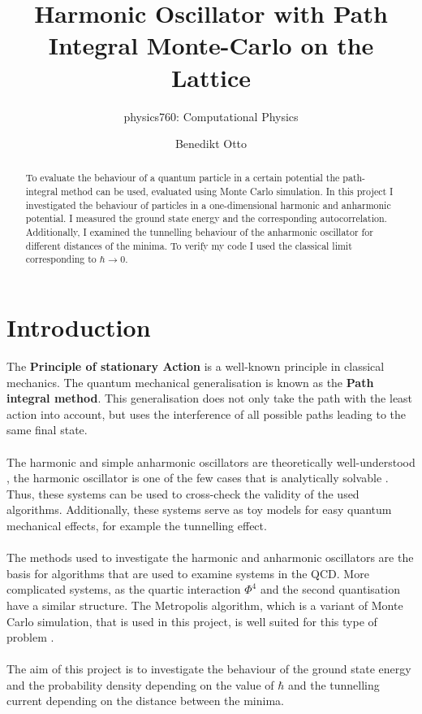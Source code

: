 \documentclass{scrartcl}
\title{Harmonic Oscillator with Path Integral Monte-Carlo on the Lattice}
\author{Benedikt Otto}
\subtitle{physics760: Computational Physics}
\begin{document}
	\maketitle

	\newpage

	\tableofcontents

	\newpage

	\begin{abstract}
		To evaluate the behaviour of a quantum particle in a certain potential the path-integral method can be used, evaluated using Monte Carlo simulation.
		In this project I investigated the behaviour of particles in a one-dimensional harmonic and anharmonic potential.
		I measured the ground state energy and the corresponding autocorrelation.
		Additionally, I examined the tunnelling behaviour of the anharmonic oscillator for different distances of the minima.
		To verify my code I used the classical limit corresponding to $\hbar \rightarrow 0$.
	\end{abstract}

	\section{Introduction}
		The \textbf{Principle of stationary Action} is a well-known principle in classical mechanics.
		The quantum mechanical generalisation is known as the \textbf{Path integral method}.
		This generalisation does not only take the path with the least action into account, but uses the interference of all possible paths leading to the same final state.
		\\\\
		The harmonic and simple anharmonic oscillators are theoretically well-understood \cite{bender}, the harmonic oscillator is one of the few cases that is analytically solvable \cite{rushka_freericks}.
		Thus, these systems can be used to cross-check the validity of the used algorithms.
		Additionally, these systems serve as toy models for easy quantum mechanical effects, for example the tunnelling effect.
		\\\\
		The methods used to investigate the harmonic and anharmonic oscillators are the basis for algorithms that are used to examine systems in the QCD.
		More complicated systems, as the quartic interaction $\Phi^4$ and the second quantisation have a similar structure.
		The Metropolis algorithm, which is a variant of Monte Carlo simulation, that is used in this project, is well suited for this type of problem \cite{creutz_freedman, rodgers_raes}.
		\\\\
		The aim of this project is to investigate the behaviour of the ground state energy and the probability density depending on the value of $\hbar$ and the tunnelling current depending on the distance between the minima.
\end{document}
